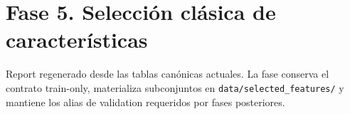 \section*{Fase 5. Selección clásica de características}
Report regenerado desde las tablas canónicas actuales. La fase conserva el contrato train-only, materializa subconjuntos en \texttt{data/selected\_features/} y mantiene los alias de validation requeridos por fases posteriores.
